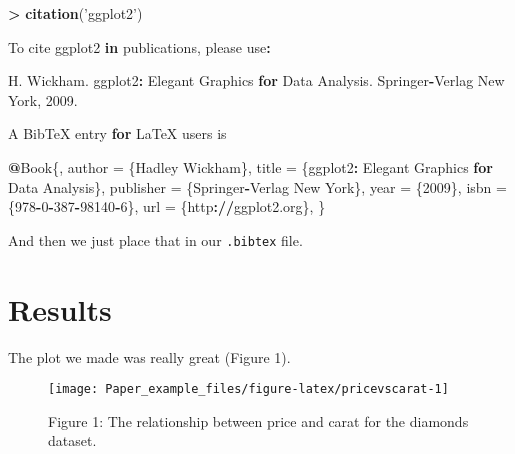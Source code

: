 \documentclass[]{article}
\newenvironment{Shaded}{\begin{snugshade}}{\end{snugshade}}
\newcommand{\KeywordTok}[1]{\textcolor[rgb]{0.13,0.29,0.53}{\textbf{#1}}}
\newcommand{\DecValTok}[1]{\textcolor[rgb]{0.00,0.00,0.81}{#1}}
\newcommand{\StringTok}[1]{\textcolor[rgb]{0.31,0.60,0.02}{#1}}
\newcommand{\ControlFlowTok}[1]{\textcolor[rgb]{0.13,0.29,0.53}{\textbf{#1}}}
\newcommand{\OperatorTok}[1]{\textcolor[rgb]{0.81,0.36,0.00}{\textbf{#1}}}
\newcommand{\ErrorTok}[1]{\textcolor[rgb]{0.64,0.00,0.00}{\textbf{#1}}}
\newcommand{\NormalTok}[1]{#1}
\begin{document}
\begin{Shaded}
\begin{Highlighting}[]
\OperatorTok{>}\StringTok{ }\KeywordTok{citation}\NormalTok{(}\StringTok{'ggplot2'}\NormalTok{)}

\NormalTok{To cite ggplot2 }\ControlFlowTok{in}\NormalTok{ publications, please use}\OperatorTok{:}

\StringTok{  }\NormalTok{H. Wickham. ggplot2}\OperatorTok{:}\StringTok{ }\NormalTok{Elegant Graphics }\ControlFlowTok{for}\NormalTok{ Data Analysis. Springer}\OperatorTok{-}\NormalTok{Verlag New York, }\DecValTok{2009}\NormalTok{.}

\NormalTok{A BibTeX entry }\ControlFlowTok{for}\NormalTok{ LaTeX users is}

  \OperatorTok{@}\NormalTok{Book\{,}
\NormalTok{    author =}\StringTok{ }\NormalTok{\{Hadley Wickham\},}
\NormalTok{    title =}\StringTok{ }\NormalTok{\{ggplot2}\OperatorTok{:}\StringTok{ }\NormalTok{Elegant Graphics }\ControlFlowTok{for}\NormalTok{ Data Analysis\},}
\NormalTok{    publisher =}\StringTok{ }\NormalTok{\{Springer}\OperatorTok{-}\NormalTok{Verlag New York\},}
\NormalTok{    year =}\StringTok{ }\NormalTok{\{}\DecValTok{2009}\NormalTok{\},}
\NormalTok{    isbn =}\StringTok{ }\NormalTok{\{}\DecValTok{978}\OperatorTok{-}\DecValTok{0}\OperatorTok{-}\DecValTok{387}\OperatorTok{-}\DecValTok{98140}\OperatorTok{-}\DecValTok{6}\NormalTok{\},}
\NormalTok{    url =}\StringTok{ }\NormalTok{\{http}\OperatorTok{:}\ErrorTok{//}\NormalTok{ggplot2.org\},}
\NormalTok{  \}}
\end{Highlighting}
\end{Shaded}

And then we just place that in our \texttt{.bibtex} file.

\section{Results}\label{results}

The plot we made was really great (Figure 1).

\begin{figure}

{\centering \texttt{[image: Paper\_example\_files/figure-latex/pricevscarat-1]} 

}

\caption{Figure  1: The relationship between price and carat for the diamonds dataset.}\label{fig:pricevscarat}
\end{figure}
\end{document}
